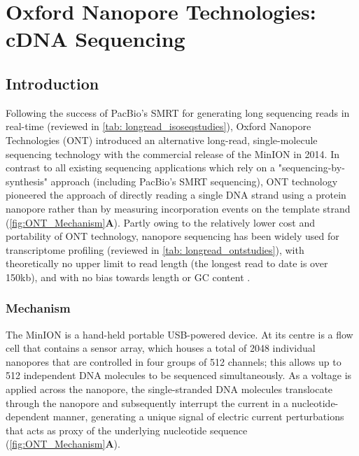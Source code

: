 \clearpage

\section{Oxford Nanopore Technologies: cDNA Sequencing}
\label{sec:ONT_cDNA_Sequencing}

\subsection{Introduction}
Following the success of PacBio's SMRT for generating long sequencing reads in real-time (reviewed in \cref{tab: longread_isoseqstudies}), Oxford Nanopore Technologies (ONT) introduced an alternative long-read, single-molecule sequencing technology with the commercial release of the MinION in 2014. In contrast to all existing sequencing applications which rely on a "sequencing-by-synthesis" approach (including PacBio's SMRT sequencing), ONT technology pioneered the approach of directly reading a single DNA strand using a protein nanopore rather than by measuring incorporation events on the template strand\cite{Jain2015} (\cref{fig:ONT_Mechanism}\textbf{A}). Partly owing to the relatively lower cost and portability of ONT technology, nanopore sequencing has been widely used for transcriptome profiling (reviewed in \cref{tab: longread_ontstudies}), 
with theoretically no upper limit to read length \cite{Loman2015} (the longest read to date is over 150kb), and with no bias towards length or GC content \cite{Oikonomopoulos2016, Weirather2017}.


\subsubsection{Mechanism}
The MinION is a hand-held portable USB-powered device. At its centre is a flow cell that contains a sensor array, which houses a total of 2048 individual nanopores that are controlled in four groups of 512 channels; this allows up to 512 independent DNA molecules to be sequenced simultaneously\cite{Jain2015}. As a voltage is applied across the nanopore, the single-stranded DNA molecules translocate through the nanopore and subsequently interrupt the current in a nucleotide-dependent manner, generating a unique signal of electric current perturbations that acts as proxy of the underlying nucleotide sequence (\cref{fig:ONT_Mechanism}\textbf{A}). 


